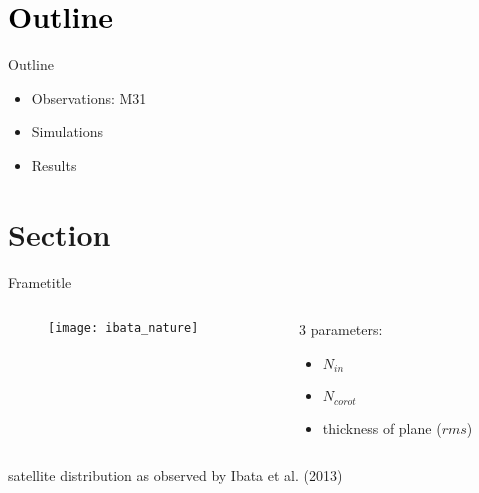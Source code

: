 { 

\begin{frame}[plain]{}
\titlepage
\end{frame}
}

\setcounter{framenumber}{0}
\section{\textcolor{black}{Outline}}
\begin{frame}{Outline}

\begin{itemize}
\item Observations: M31
\vspace{.25cm}
\item Simulations
\vspace{.25cm}
\item Results
\end{itemize}
\end{frame}

\section{Section}
\begin{frame}{Frametitle}
\begin{columns}
	\begin{column}{7.25cm}
\vspace*{-.625cm}
\begin{figure}
	\texttt{[image: ibata\_nature]}
	\vspace*{-.25cm}
\end{figure}
\end{column}
	\begin{column}{4.75cm}
3 parameters: 
\begin{itemize}
\item$N_{in}$
\item$N_{corot}$
\item thickness of plane ($rms$)
\end{itemize}
	\end{column}
	\end{columns}
\vspace*{.2cm}
satellite distribution as observed by Ibata et al. (2013)%
\end{frame}


